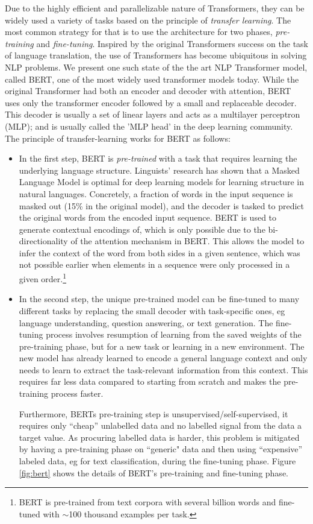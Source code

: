 Due to the highly efficient and parallelizable nature of Transformers, they can be widely used a variety of tasks based on the principle of \emph{transfer learning}. The most common strategy for that is to use the architecture for two phases, \emph{pre-training} and \emph{fine-tuning}. Inspired by the original Transformers success on the task of language translation, the use of Transformers has become ubiquitous in solving NLP problems. We present one such state of the the art NLP Transformer model, 
called BERT\cite{devlinBERTPretrainingDeep2019}, one of the most widely used transformer models today.
While the original Transformer had both an encoder and decoder with attention, BERT uses only the transformer encoder followed by a small and replaceable decoder. This decoder is usually a set of linear layers and acts as a multilayer perceptron (MLP); and is usually called the 'MLP head' in the deep learning community. The principle of transfer-learning works for BERT as follows:

\begin{itemize}
\item In the first step, BERT is \emph{pre-trained} with a task that requires learning the underlying language structure. Linguists' research has shown that a Masked Language Model is optimal for deep learning models for learning structure in natural languages.\cite{wettigShouldYouMask}
Concretely, a fraction of words in the input sequence is masked out (15\% in the original model), and the decoder is tasked to predict the original words from the encoded input sequence.
BERT is used to generate contextual encodings of, which is only possible due to the bi-directionality of the attention mechanism in BERT. This allows the model to infer the context of the word from both sides in a given sentence, which was not possible earlier when elements in a sequence were only processed in a given order.\footnote{
    BERT is pre-trained from text corpora with several billion words and fine-tuned with $\sim$100 thousand examples per task.
}

\item In the second step, the unique pre-trained model can be fine-tuned to many different tasks by replacing the small decoder with task-specific ones, eg language understanding, question answering, or text generation.
The fine-tuning process involves resumption of learning from the saved weights of the pre-training phase, but for a new task or learning in a new environment. The new model has already learned to encode a general language context and only needs to learn to extract the task-relevant information from this context. This requires far less data compared to starting from scratch and makes the pre-training process faster.

Furthermore, BERTs pre-training step is unsupervised/self-supervised, \ie it requires only ``cheap'' unlabelled data and no labelled signal from the data a target value. As procuring labelled data is harder, this problem is mitigated by having a pre-training phase on ``generic" data and then using 
``expensive'' labeled data, eg for text classification, during the fine-tuning phase. Figure \ref{fig:bert} shows the details of BERT's pre-training and fine-tuning phase.
\end{itemize}

